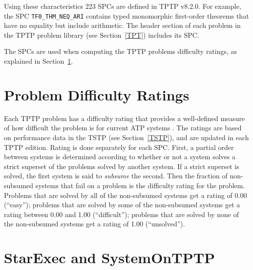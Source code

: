 \documentclass{easychair}
\begin{document}
Using these characteristics 223 SPCs are defined in TPTP v8.2.0. 
For example, the SPC
{\tt TF0\_THM\_NEQ\_ARI} contains typed monomorphic first-order theorems that have no equality but 
include arithmetic.
The header section of each problem in the TPTP problem library (see Section~\ref{TPT}) includes 
its SPC.

The SPCs are used when computing the TPTP problems difficulty ratings, as explained in
Section~\ref{Ratings}.

\section{Problem Difficulty Ratings}
\label{Ratings}

Each TPTP problem has a difficulty rating that provides a well-defined measure of how difficult 
the problem is for current ATP systems \cite{SS01}.
The ratings are based on performance data in the TSTP (see Section~\ref{TSTP}), and are updated
in each TPTP edition.
Rating is done separately for each SPC.
First, a partial order between systems is determined according to whether or not a system 
solves a strict superset of the problems solved by another system. 
If a strict superset is solved, the first system is said to {\em subsume} the second. 
Then the fraction of non-subsumed systems that fail on a problem is the difficulty rating 
for the problem. 
Problems that are solved by all of the non-subsumed systems get a rating of 0.00 (``easy'');
problems that are solved by some of the non-subsumed systems get a rating between 
0.00 and 1.00 (``difficult''); 
problems that are solved by none of the non-subsumed systems get a rating of 1.00 (``unsolved'').

\section{StarExec and SystemOnTPTP}
\label{StarExec}
\end{document}
